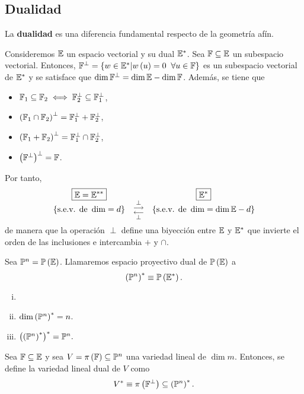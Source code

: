 \subsection{Dualidad}
La \textbf{dualidad} es una diferencia fundamental respecto de la geometría afín.
\begin{rec}
    Consideremos $\mathbb{E}$ un espacio vectorial y su dual $\mathbb{E}^*$. Sea $\mathbb{F} \subseteq \mathbb{E}$ un subespacio vectorial. Entonces, $\F^\perp=\left\{w \in \E ^* | w \left( u \right) = 0 \hspace{0,2cm} \forall u\in\F \right\} $ es un subespacio vectorial de $\mathbb{E}^*$ y se satisface que $\dim \mathbb{F}^\perp = \dim \mathbb{E} - \dim \mathbb{F}$. Además, se tiene que
    \begin{itemize}
        \item $\mathbb{F}_1 \subseteq \mathbb{F}_2 \iff \mathbb{F}_2^\perp \subseteq \mathbb{F}_1^\perp$,
        \item $\left( \mathbb{F}_1 \cap \mathbb{F}_2 \right) ^\perp = \mathbb{F}_1^\perp + \mathbb{F}_2^\perp$,
        \item $\left( \mathbb{F}_1 + \mathbb{F}_2 \right)^\perp=\mathbb{F}_1^\perp \cap \mathbb{F}_2^\perp$,
        \item $\left( \mathbb{F}^\perp\right)^\perp=\mathbb{F}$.
    \end{itemize}
    Por tanto,
    \[
        \begin{array}{ccc}
             \boxed{\mathbb{E} = \mathbb{E}^{**}} & & \boxed{\mathbb{E}^*}\\
             \left\{\text{s.e.v. de }\dim = d \right\} & \substack{\perp \\ \longrightarrow \\  \longleftarrow \\ \perp} & \left\{\text{s.e.v. de }\dim = \dim \mathbb{E} - d \right\}
        \end{array}
    \]
    de manera que la operación $\perp$ define una biyección entre $\mathbb{E}$ y $\mathbb{E}^*$ que invierte el orden de las inclusiones e intercambia $+$ y $\cap$.
\end{rec}
\begin{defi}
    Sea $\mathbb{P}^n=\mathbb{P}\left(\mathbb{E}\right)$. Llamaremos espacio proyectivo dual de $\mathbb{P}\left(\mathbb{E}\right)$ a
    \[
        \left( \mathbb{P}^n \right)^* \equiv \mathbb{P}\left(\mathbb{E}^*\right).
    \]
\end{defi}
\begin{obs}
    \begin{enumerate}[i)]
        \item []
        \item $\dim \left( \mathbb{P} ^n \right) ^* = n$.
        \item $\left( \left( \mathbb{P} ^n \right)^* \right) ^* = \mathbb{P}^n. $
    \end{enumerate}
\end{obs}
\begin{defi}
    Sea $\mathbb{F}\subseteq \mathbb{E}$ y sea $V=\pi\left(\mathbb{F}\right)\subseteq\mathbb{P}^n$ una variedad lineal de $\dim m$. Entonces, se define la variedad lineal dual de $V$ como
    \[
        V^* \equiv \pi \left( \mathbb{F}^\perp\right) \subseteq \left( \mathbb{P}^n \right)^*.
    \]
    
\end{defi}

